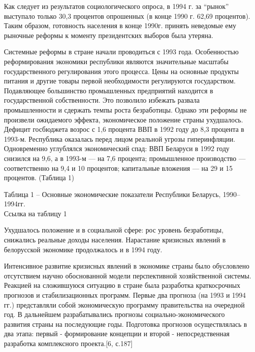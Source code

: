 \documentclass[14pt,a4paper]{article}
\begin{document}
    \par
    Как следует из результатов социологического опроса, в 1994 г. за ``рынок'' выступало только 30,3 процентов опрошенных (в конце 1990 г. 62,69 процентов).
    Таким образом, готовность населения в конце 1990г. принять неведомые ему рыночные реформы к моменту президентских выборов была утеряна.
    \par
    Системные реформы в стране начали проводиться с 1993 года.
    Особенностью реформирования экономики республики являются значительные масштабы государственного регулирования этого процесса.
    Цены на основные продукты питания и другие товары первой необходимости регулируются государством.
    Подавляющее большинство промышленных предприятий находится в государственной собственности.
    Это позволило избежать развала промышленности и сдержать темпы роста безработицы.
    Однако эти реформы не произвели ожидаемого эффекта, экономическое положение страны ухудшалось.
    Дефицит госбюджета возрос с 1,6 процента ВВП в 1992 году до 8,3 процента в 1993-м.
    Республика оказалась перед лицом реальной угрозы гиперинфляции.
    Одновременно углублялся экономический спад: ВВП Беларуси в 1992 году снизился на 9,6, а в 1993-м — на 7,6 процента; промышленное производство — соответственно на 9,4 и 10 процентов; капитальные вложения — на 29 и 15 процентов. (Таблица 1)
    \\
    \par
    Таблица 1 – Основные экономические показатели Республики Беларусь, 1990--1994гг.
    \\
    Ссылка на таблицу 1
    \par
    Ухудшалось положение и в социальной сфере: рос уровень безработицы, снижались реальные доходы населения.
    Нарастание кризисных явлений в белорусской экономике продолжалось и в 1994 году.
    \par
    Интенсивное развитие кризисных явлений в экономике страны было обусловлено отсутствием научно обоснованной модели перспективной хозяйственной системы.
    Реакцией на сложившуюся ситуацию в стране была разработка краткосрочных прогнозов и стабилизационных программ. Первые два прогноза (на 1993 и 1994 гг.) представляли собой экономическую программу правительства на очередной год.
    В дальнейшем разрабатывались прогнозы социально-экономического развития страны на последующие годы.
    Подготовка прогнозов осуществлялась в два этапа: первый - формирование концепции и второй - непосредственная разработка комплексного проекта.[6, с.187]
    \par
\end{document}

